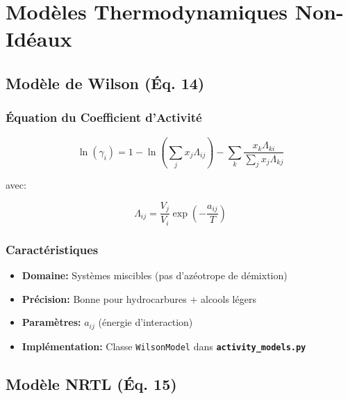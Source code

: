 \documentclass[11pt,a4paper]{article}
\newcommand{\code}[1]{\texttt{#1}}
\newcommand{\file}[1]{\texttt{\textbf{#1}}}
\begin{document}
\section{Modèles Thermodynamiques Non-Idéaux}

\subsection{Modèle de Wilson (Éq. 14)}

\subsubsection{Équation du Coefficient d'Activité}

\begin{tcolorbox}[colback=yellow!10,colframe=orange!50!black,title=Équation 14: Modèle de Wilson]
\begin{equation}
\ln(\gamma_i) = 1 - \ln\left(\sum_j x_j \Lambda_{ij}\right) - \sum_k \frac{x_k \Lambda_{ki}}{\sum_j x_j \Lambda_{kj}}
\end{equation}
\end{tcolorbox}

avec:

\begin{equation}
\Lambda_{ij} = \frac{V_j}{V_i} \exp\left(-\frac{a_{ij}}{T}\right)
\end{equation}

\subsubsection{Caractéristiques}

\begin{itemize}[leftmargin=*]
    \item \textbf{Domaine:} Systèmes miscibles (pas d'azéotrope de démixtion)
    \item \textbf{Précision:} Bonne pour hydrocarbures + alcools légers
    \item \textbf{Paramètres:} $a_{ij}$ (énergie d'interaction)
    \item \textbf{Implémentation:} Classe \code{WilsonModel} dans \file{activity\_models.py}
\end{itemize}

\subsection{Modèle NRTL (Éq. 15)}
\end{document}
